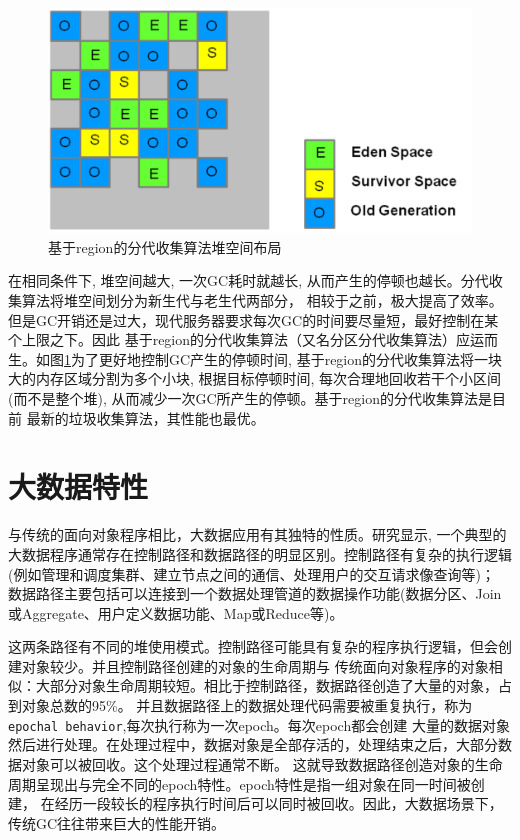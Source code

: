 \begin{figure}[h]
    \centering
    \includegraphics[width=12cm]{figure/region-based-gc.png}
    \caption{基于region的分代收集算法堆空间布局\cite{G1}}
    \label{jvm_region-gc}
\end{figure}
在相同条件下, 堆空间越大, 一次GC耗时就越长, 从而产生的停顿也越长。分代收集算法将堆空间划分为新生代与老生代两部分，
相较于之前，极大提高了效率。但是GC开销还是过大，现代服务器要求每次GC的时间要尽量短，最好控制在某个上限之下。因此
基于region的分代收集算法（又名分区分代收集算法）应运而生。如图\ref{jvm_region-gc}为了更好地控制GC产生的停顿时间, 基于region的分代收集算法将一块大的内存区域分割为多个小块, 
根据目标停顿时间, 每次合理地回收若干个小区间(而不是整个堆), 从而减少一次GC所产生的停顿。基于region的分代收集算法是目前
最新的垃圾收集算法，其性能也最优。

\section{大数据特性}
与传统的面向对象程序相比，大数据应用有其独特的性质。研究\cite{gog2015broom,nguyen2015facade,bu2013bloat}显示,
一个典型的大数据程序通常存在控制路径和数据路径的明显区别。控制路径有复杂的执行逻辑(例如管理和调度集群、建立节点之间的通信、处理用户的交互请求像查询等)；
数据路径主要包括可以连接到一个数据处理管道的数据操作功能(数据分区、Join或Aggregate、用户定义数据功能、Map或Reduce等)。

这两条路径有不同的堆使用模式。控制路径可能具有复杂的程序执行逻辑，但会创建对象较少。并且控制路径创建的对象的生命周期与
传统面向对象程序的对象相似：大部分对象生命周期较短。相比于控制路径，数据路径创造了大量的对象，占到对象总数的95\%\cite{bu2013bloat}。
并且数据路径上的数据处理代码需要被重复执行，称为\texttt{epochal behavior},每次执行称为一次epoch。每次epoch都会创建
大量的数据对象然后进行处理。在处理过程中，数据对象是全部存活的，处理结束之后，大部分数据对象可以被回收。这个处理过程通常不断。
这就导致数据路径创造对象的生命周期呈现出与完全不同的epoch特性。epoch特性是指一组对象在同一时间被创建，
在经历一段较长的程序执行时间后可以同时被回收。因此，大数据场景下，传统GC往往带来巨大的性能开销。



